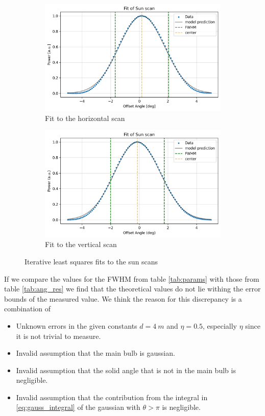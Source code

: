 \begin{figure}[ht]
    \centering
    \begin{subfigure}[b]{0.45\textwidth}
        \centering
        \includegraphics[width=\textwidth]{assets/sun_scan_fit_h.png}
        \caption{Fit to the horizontal scan}
        \label{fig:sun_fit_h}
    \end{subfigure}
    \hfill
    \begin{subfigure}[b]{0.45\textwidth}
        \centering
        \includegraphics[width=\textwidth]{assets/sun_scan_fit_v.png}
        \caption{Fit to the vertical scan}
        \label{fig:sun_fit_v}
    \end{subfigure}
    \caption{Iterative least squares fits to the sun scans}
    \label{fig:sun_scan_fit}
\end{figure}
If we compare the values for the FWHM from table \ref{tab:params} with those from table \ref{tab:ang_res}
we find that the theoretical values do not lie withing the error bounds of the measured value.
We think the reason for this discrepancy is a combination of
\begin{itemize}
    \item Unknown errors in the given constants $d = \SI{4}{m}$ and $\eta = 0.5$, especially $\eta$ since it is not trivial to measure.
    \item Invalid assumption that the main bulb is gaussian.
    \item Invalid assumption that the solid angle that is not in the main bulb is negligible.
    \item Invalid assumption that the contribution from the integral in \eqref{eq:gauss_integral} of the gaussian with $\theta > \pi$ is negligible.
\end{itemize}